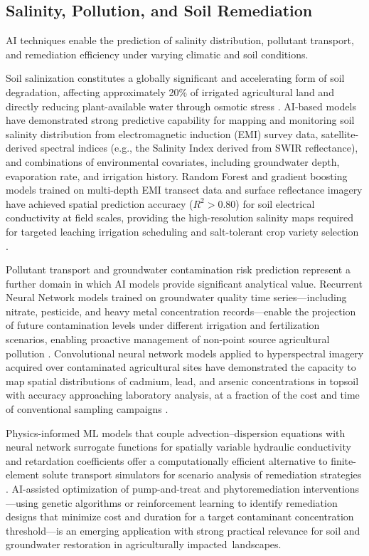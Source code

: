 \documentclass[land,review,accept,pdftex,oneauthor]{Definitions/mdpi}
\begin{document}
\subsection{Salinity, Pollution, and Soil Remediation}\label{sec5.4}

AI techniques enable the prediction of salinity distribution, pollutant transport, and remediation efficiency under varying climatic and soil conditions.

Soil salinization constitutes a globally significant and accelerating form of soil degradation, affecting approximately 20\% of irrigated agricultural land and directly reducing plant-available water through osmotic stress \citep{nachshon2018cropland}. AI-based models have demonstrated strong predictive capability for mapping and monitoring soil salinity distribution from electromagnetic induction (EMI) survey data, satellite-derived spectral indices (e.g., the Salinity Index derived from SWIR reflectance), and combinations of environmental covariates, including groundwater depth, evaporation rate, and irrigation history. Random Forest and gradient boosting models trained on multi-depth EMI transect data and surface reflectance imagery have achieved spatial prediction accuracy ($R^2 > 0.80$) for soil electrical conductivity at field scales, providing the high-resolution salinity maps required for targeted leaching irrigation scheduling and salt-tolerant crop variety selection \citep{Lemenkova202515}.

Pollutant transport and groundwater contamination risk prediction represent a further domain in which AI models provide significant analytical value. Recurrent Neural Network models trained on groundwater quality time series---including nitrate, pesticide, and heavy metal concentration records---{enable the projection of} future contamination levels under different irrigation and fertilization scenarios, enabling proactive management of non-point source agricultural pollution \citep{rahmati2019groundwater,Lemenkova202214,Lemenkova202233}. Convolutional neural network models applied to hyperspectral imagery acquired over contaminated agricultural sites have demonstrated the capacity to map spatial distributions of cadmium, lead, and arsenic concentrations in topsoil with accuracy approaching laboratory analysis, at a fraction of the cost and time of conventional sampling campaigns {\citep{hong2021multimodal,Lemenkova202402}}. 

Physics-informed ML models that couple advection--dispersion equations with neural network surrogate functions for spatially variable hydraulic conductivity and retardation coefficients offer a computationally efficient alternative to finite-element solute transport simulators for scenario analysis of remediation strategies {\citep{raissi2019physics,Karniadakis2021,ghorbani2021physics}}. AI-assisted optimization of pump-and-treat and phytoremediation interventions---using genetic algorithms or reinforcement learning to identify remediation designs that minimize cost and duration for a target contaminant concentration threshold---is an emerging application with strong practical relevance for soil and groundwater restoration in agriculturally impacted~landscapes.
\end{document}
